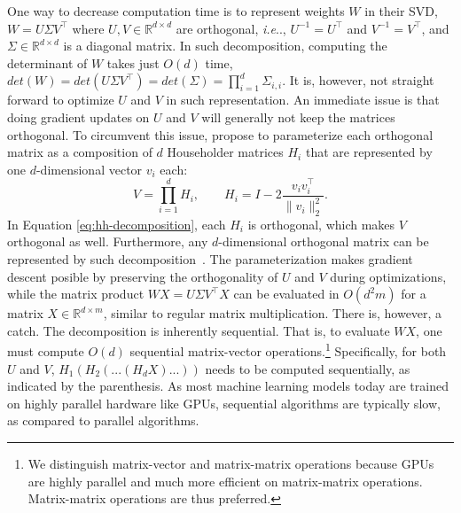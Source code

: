 \documentclass[11pt,a4paper,twoside,openright,final]{memoir}
\makeatletter
\DeclareRobustCommand\onedot{\futurelet\@let@token\@onedot}
\def\@onedot{\ifx\@let@token.\else.\null\fi\xspace}
\def\ie{\emph{i.e}\onedot} \def\Ie{\emph{I.e}\onedot}
\makeatother
\begin{document}
One way to decrease computation time is to represent weights $W$ in their SVD, $W = U\Sigma V^\intercal$ where $U, V \in \mathbb{R}^{d\times d}$ are orthogonal, \ie, $U^{-1} = U^\intercal$ and $V^{-1}= V^\intercal$, and $\Sigma\in \mathbb{R}^{d\times d}$ is a diagonal matrix. 
In such decomposition, computing the determinant of $W$ takes just $O(d)$ time, $det(W) = det(U\Sigma V^\intercal) = det(\Sigma) = \prod_{i=1}^d \Sigma_{i,i}$.
It is, however, not straight forward to optimize $U$ and $V$ in such representation.
An immediate issue is that doing gradient updates on $U$ and $V$ will generally not keep the matrices orthogonal.
To circumvent this issue, \citet{sequential} propose to parameterize each orthogonal matrix as a composition of $d$ Householder matrices $H_i$ that are represented by one $d$-dimensional vector $v_i$ each:
\begin{equation}\label{eq:hh-decomposition}
    V = \prod_{i=1}^d H_i, \qquad H_i = I - 2\frac{v_i v_i^\intercal}{\| v_i \|_2^2}.
\end{equation}
In Equation \ref{eq:hh-decomposition}, each $H_i$ is orthogonal, which makes $V$ orthogonal as well. Furthermore, any $d$-dimensional orthogonal matrix can be represented by such decomposition~\cite{uhlig2001constructive}. 
The parameterization makes gradient descent posible by preserving the orthogonality of $U$ and $V$ during optimizations, while the matrix product $WX = U \Sigma V^\intercal X$ can be evaluated in $O(d^2m)$ for a matrix $X\in\mathbb{R}^{d\times m}$, similar to regular matrix multiplication. 
There is, however, a catch.
The decomposition is inherently sequential. 
That is, to evaluate $WX$, one must compute $O(d)$ sequential matrix-vector operations.\footnote{We distinguish matrix-vector and matrix-matrix operations because GPUs are highly parallel and much more efficient on matrix-matrix operations. Matrix-matrix operations are thus preferred.}
Specifically, for both $U$ and $V$, $H_1(H_2(...(H_dX) ...))$ needs to be computed sequentially, as indicated by the parenthesis.
As most machine learning models today are trained on highly parallel hardware like GPUs, sequential algorithms are typically slow, as compared to parallel algorithms.
\end{document}
